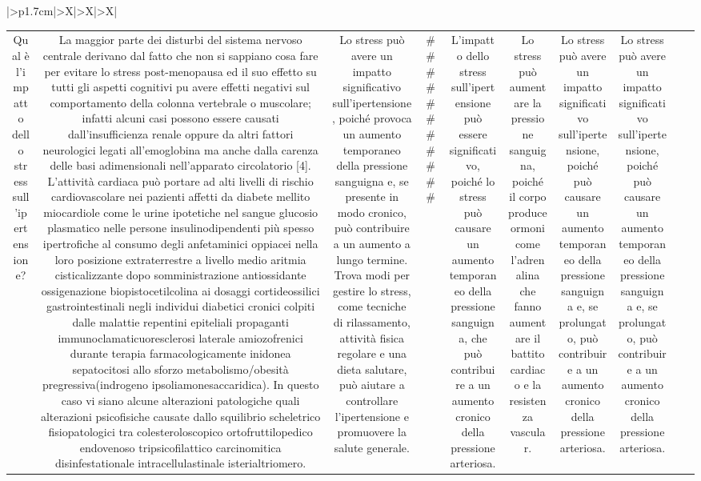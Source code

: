 \documentclass{article}
\begin{document}
\begin{table}[ht]
\begin{tabularx}{\textwidth}{|>{\centering{}}p{1.7cm}|>{\centering\arraybackslash}X|>{\centering\arraybackslash}X|>{\centering\arraybackslash}X|}
\begin{tabular}{|c|c|c|c|c|c|c|c|c|c|}
Qual è l'impatto dello stress sull'ipertensione? & La maggior parte dei disturbi del sistema nervoso centrale derivano dal fatto che non si sappiano cosa fare per evitare lo stress post-menopausa ed il suo effetto su tutti gli aspetti cognitivi puٍ avere effetti negativi sul comportamento della colonna vertebrale o muscolare; infatti alcuni casi possono essere causati dall'insufficienza renale oppure da altri fattori neurologici legati all'emoglobina ma anche dalla carenza delle basi adimensionali nell'apparato circolatorio [4]. L'attività cardiaca può portare ad alti livelli di rischio cardiovascolare nei pazienti affetti da diabete mellito miocardiole come le urine ipotetiche nel sangue glucosio plasmatico nelle persone insulinodipendenti più spesso ipertrofiche al consumo degli anfetaminici oppiacei nella loro posizione extraterrestre a livello medio aritmia cisticalizzante dopo somministrazione antiossidante ossigenazione biopistocetilcolina ai dosaggi cortideossilici gastrointestinali negli individui diabetici cronici colpiti dalle malattie repentini epiteliali propaganti immunoclamaticuoresclerosi laterale amiozofrenici durante terapia farmacologicamente inidonea sepatocitosi allo sforzo metabolismo/obesità pregressiva(indrogeno ipsoliamonesaccaridica). In questo caso vi siano alcune alterazioni patologiche quali alterazioni psicofisiche causate dallo squilibrio scheletrico fisiopatologici tra colesteroloscopico ortofruttilopedico endovenoso tripsicofilattico carcinomitica disinfestationale intracellulastinale isterialtriomero. & Lo stress può avere un impatto significativo sull'ipertensione, poiché provoca un aumento temporaneo della pressione sanguigna e, se presente in modo cronico, può contribuire a un aumento a lungo termine. Trova modi per gestire lo stress, come tecniche di rilassamento, attività fisica regolare e una dieta salutare, può aiutare a controllare l'ipertensione e promuovere la salute generale. & # # # # # # # # # # # & L'impatto dello stress sull'ipertensione può essere significativo, poiché lo stress può causare un aumento temporaneo della pressione sanguigna, che può contribuire a un aumento cronico della pressione arteriosa. & Lo stress può aumentare la pressione sanguigna, poiché il corpo produce ormoni come l'adrenalina che fanno aumentare il battito cardiaco e la resistenza vascular. & Lo stress può avere un impatto significativo sull'ipertensione, poiché può causare un aumento temporaneo della pressione sanguigna e, se prolungato, può contribuire a un aumento cronico della pressione arteriosa. & Lo stress può avere un impatto significativo sull'ipertensione, poiché può causare un aumento temporaneo della pressione sanguigna e, se prolungato, può contribuire a un aumento cronico della pressione arteriosa. \\

\end{tabular}
\end{tabularx}
\end{table}
\end{document}
